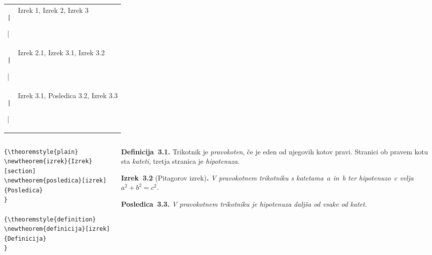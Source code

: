 \documentclass[aspectratio=169]{beamer}
\newcommand{\razdelek}[2]{\par\smallskip{\large\bfseries #1\quad #2}\par\smallskip}
\newcommand{\izrekams}[2]{\textbf{Izrek~#1} (#2)\textbf{.}}
\begin{document}
\begin{frame}[fragile]{}
  \begin{tabular}{ll}
    \texttt|\newtheorem{izrek}{Izrek}| & Izrek 1, Izrek 2, Izrek 3 \\
    \texttt|\newtheorem{izrek}{Izrek}[section]| & Izrek 2.1, Izrek 3.1, Izrek 3.2 \\
    \texttt|\newtheorem{posledica}[izrek]{Posledica}| & Izrek 3.1, Posledica 3.2, Izrek 3.3 \\
  \end{tabular}
\end{frame}

\begin{frame}[fragile]{}
  \begin{columns}[T]
    \begin{column}{0.5\textwidth}
      \begin{verbatim}
{\theoremstyle{plain}
\newtheorem{izrek}{Izrek}[section]
\newtheorem{posledica}[izrek]{Posledica}
}

{\theoremstyle{definition}
\newtheorem{definicija}[izrek]{Definicija}
}
      \end{verbatim}
    \end{column}
    \begin{column}{0.45\textwidth}
      \footnotesize
      \razdelek{3}{Pitagorov izrek}
      \textbf{Definicija~3.1.}
      Trikotnik je \emph{pravokoten}, če je eden od njegovih kotov pravi.
      Stranici ob pravem kotu sta \emph{kateti}, tretja stranica je \emph{hipotenuza}.

      \medskip
      \izrekams{3.2}{Pitagorov izrek}
      \emph{V pravokotnem trikotniku s katetama~\(a\) in~\(b\) ter hipotenuzo~\(c\) velja \(a^2 + b^2 = c^2\).}

      \medskip
      \textbf{Posledica~3.3.}
      \emph{V pravokotnem trikotniku je hipotenuza daljša od vsake od katet.}
    \end{column}
  \end{columns}
\end{frame}
\end{document}
